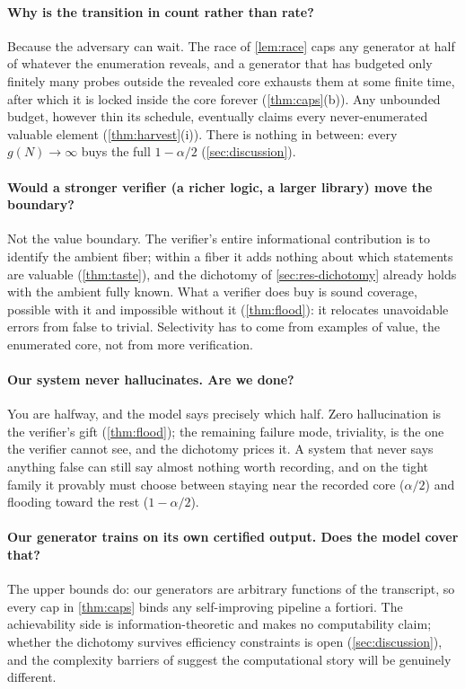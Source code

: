 \documentclass[11pt]{article}
\numberwithin{equation}{section}
\theoremstyle{plain}
\theoremstyle{definition}
\theoremstyle{remark}
\begin{document}
\paragraph{Why is the transition in count rather than rate?}
Because the adversary can wait. The race of \cref{lem:race} caps any generator at half of
whatever the enumeration reveals, and a generator that has budgeted only finitely many
probes outside the revealed core exhausts them at some finite time, after which it is
locked inside the core forever (\cref{thm:caps}(b)). Any unbounded budget, however thin its
schedule, eventually claims every never-enumerated valuable element
(\cref{thm:harvest}(i)). There is nothing in between: every $g(N) \to \infty$ buys the full
$1 - \alpha/2$ (\cref{sec:discussion}).

\paragraph{Would a stronger verifier (a richer logic, a larger library) move the boundary?}
Not the value boundary. The verifier's entire informational contribution is to identify the
ambient fiber; within a fiber it adds nothing about which statements are valuable
(\cref{thm:taste}), and the dichotomy of \cref{sec:res-dichotomy} already holds with the
ambient fully known. What a verifier does buy is sound coverage, possible with it and
impossible without it (\cref{thm:flood}): it relocates unavoidable errors from false to
trivial. Selectivity has to come from examples of value, the enumerated core, not from more
verification.

\paragraph{Our system never hallucinates. Are we done?}
You are halfway, and the model says precisely which half. Zero hallucination is the
verifier's gift (\cref{thm:flood}); the remaining failure mode, triviality, is the one the
verifier cannot see, and the dichotomy prices it. A system that never says anything false
can still say almost nothing worth recording, and on the tight family it provably must
choose between staying near the recorded core ($\alpha/2$) and flooding toward the rest
($1 - \alpha/2$).

\paragraph{Our generator trains on its own certified output. Does the model cover that?}
The upper bounds do: our generators are arbitrary functions of the transcript, so every cap
in \cref{thm:caps} binds any self-improving pipeline a fortiori. The achievability side is
information-theoretic and makes no computability claim; whether the dichotomy survives
efficiency constraints is open (\cref{sec:discussion}), and the complexity barriers of
\citet{arenas2025complexity} suggest the computational story will be genuinely different.
\end{document}
